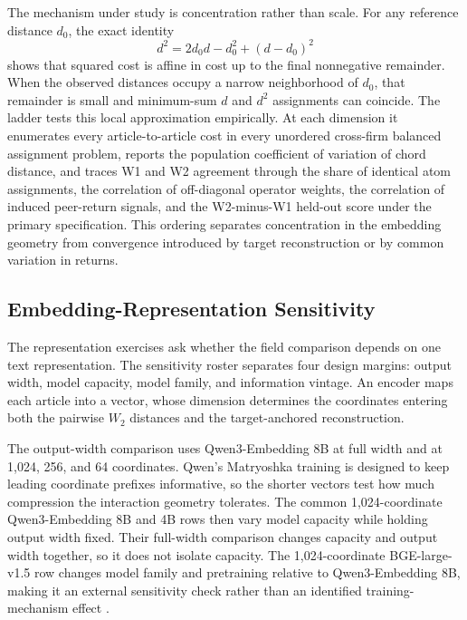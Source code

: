 The mechanism under study is concentration rather than scale.
For any reference distance $d_0$, the exact identity
\[
  d^2=2d_0d-d_0^2+(d-d_0)^2
\]
shows that squared cost is affine in cost up to the final nonnegative
remainder.
When the observed distances occupy a narrow neighborhood of $d_0$, that
remainder is small and minimum-sum $d$ and $d^2$ assignments can coincide.
The ladder tests this local approximation empirically.
At each dimension it enumerates every article-to-article cost in every
unordered cross-firm balanced assignment problem, reports the population
coefficient of variation of chord distance, and traces W1 and W2 agreement
through the share of identical atom assignments, the correlation of
off-diagonal operator weights, the correlation of induced peer-return signals,
and the W2-minus-W1 held-out score under the primary specification.
This ordering separates concentration in the embedding geometry from
convergence introduced by target reconstruction or by common variation in
returns.



\subsection{Embedding-Representation Sensitivity}
\label{sec:p5-representation-ablation}

The representation exercises ask whether the field comparison depends on one
text representation.
The sensitivity roster separates four design margins: output width, model
capacity, model family, and information vintage.
An encoder maps each article into a vector, whose dimension determines the
coordinates entering both the pairwise $W_2$ distances and the target-anchored
reconstruction.

The output-width comparison uses Qwen3-Embedding 8B at full width and at 1,024,
256, and 64 coordinates.
Qwen's Matryoshka training is designed to keep leading coordinate prefixes
informative, so the shorter vectors test how much compression the interaction
geometry tolerates.
The common 1,024-coordinate Qwen3-Embedding 8B and 4B rows then vary model
capacity while holding output width fixed.
Their full-width comparison changes capacity and output width together, so it
does not isolate capacity.
The 1,024-coordinate BGE-large-v1.5 row changes model family and pretraining
relative to Qwen3-Embedding 8B, making it an external sensitivity check rather
than an identified training-mechanism effect
\citep{qwen3_embedding_2025,xiao_cpack_2023}.

